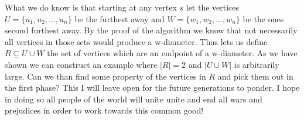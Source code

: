 What we do know is that starting at any vertex $s$ let the vertices $U = \{u_1, u_2, ..., u_n\}$ be the furthest away and $W = \{w_1, w_2, ..., w_n\}$ be the ones second furthest away. By the proof of the algorithm we know that not necessarily all vertices in those sets would produce a w-diameter. Thus lets us define $R \subseteq U \cup W$ the set of vertices which are an endpoint of a w-diameter. As we have shown we can construct an example where $|R| = 2$ and $|U \cup W|$ is arbitrarily large. Can we than find some property of the vertices in $R$ and pick them out in the first phase? This I will leave open for the future generations to ponder. I hope in doing so all people of the world will unite unite and end all wars and prejudices in order to work towards this common good!

\cite{parikh1980adaptive}
